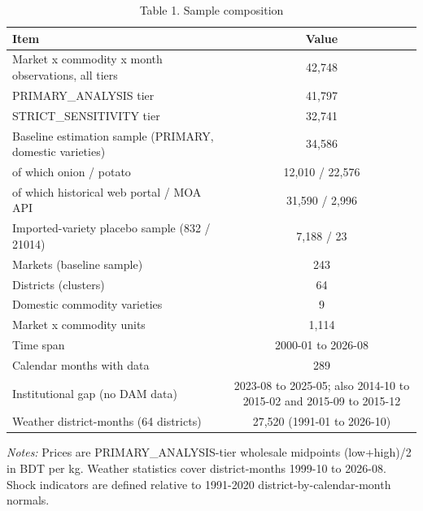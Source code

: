 \begin{table}[htbp]\centering\small
\caption{Table 1. Sample composition}\label{tab:table1c_sample_composition}
\begin{tabular}{lc}
\toprule
Item & Value \\
\midrule
Market x commodity x month observations, all tiers & 42,748 \\
PRIMARY\_ANALYSIS tier & 41,797 \\
STRICT\_SENSITIVITY tier & 32,741 \\
Baseline estimation sample (PRIMARY, domestic varieties) & 34,586 \\
  of which onion / potato & 12,010 / 22,576 \\
  of which historical web portal / MOA API & 31,590 / 2,996 \\
Imported-variety placebo sample (832 / 21014) & 7,188 / 23 \\
Markets (baseline sample) & 243 \\
Districts (clusters) & 64 \\
Domestic commodity varieties & 9 \\
Market x commodity units & 1,114 \\
Time span & 2000-01 to 2026-08 \\
Calendar months with data & 289 \\
Institutional gap (no DAM data) & 2023-08 to 2025-05; also 2014-10 to 2015-02 and 2015-09 to 2015-12 \\
Weather district-months (64 districts) & 27,520 (1991-01 to 2026-10) \\
\bottomrule
\end{tabular}
\begin{minipage}{0.95\linewidth}\footnotesize \textit{Notes:} Prices are PRIMARY\_ANALYSIS-tier wholesale midpoints (low+high)/2 in BDT per kg. Weather statistics cover district-months 1999-10 to 2026-08. Shock indicators are defined relative to 1991-2020 district-by-calendar-month normals.\end{minipage}
\end{table}